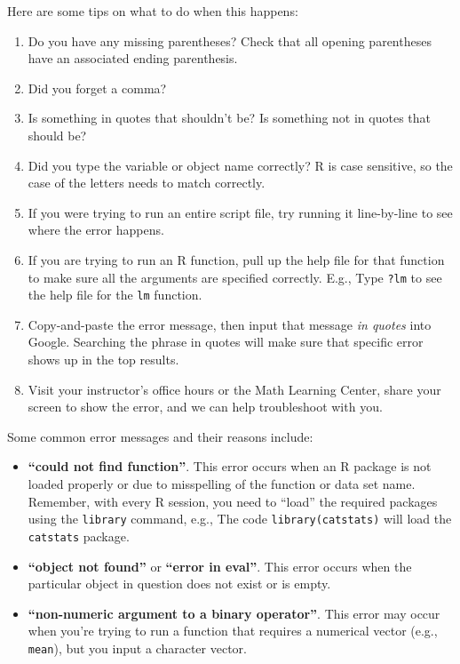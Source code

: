 \documentclass[
  10pt,
  openany]{book}
\providecommand{\tightlist}{%
  \setlength{\itemsep}{0pt}\setlength{\parskip}{0pt}}
\theoremstyle{definition}
\theoremstyle{definition}
\theoremstyle{definition}
\theoremstyle{definition}
\theoremstyle{remark}
\begin{document}
Here are some tips on what to do when this happens:

\begin{enumerate}
\def\labelenumi{\arabic{enumi}.}
\tightlist
\item
  Do you have any missing parentheses? Check that all opening parentheses have an associated ending parenthesis.
\item
  Did you forget a comma?
\item
  Is something in quotes that shouldn't be? Is something not in quotes that should be?
\item
  Did you type the variable or object name correctly? R is case sensitive, so the case of the letters needs to match correctly.
\item
  If you were trying to run an entire script file, try running it line-by-line to see where the error happens.
\item
  If you are trying to run an R function, pull up the help file for that function to make sure all the arguments are specified correctly. E.g., Type \texttt{?lm} to see the help file for the \texttt{lm} function.
\item
  Copy-and-paste the error message, then input that message \emph{in quotes} into Google. Searching the phrase in quotes will make sure that specific error shows up in the top results.
\item
  Visit your instructor's office hours or the Math Learning Center, share your screen to show the error, and we can help troubleshoot with you.
\end{enumerate}

Some common error messages and their reasons include:

\begin{itemize}
\tightlist
\item
  \textbf{``could not find function''}. This error occurs when an R package is not loaded properly or due to misspelling of the function or data set name. Remember, with every R session, you need to ``load'' the required packages using the \texttt{library} command, e.g., The code \texttt{library(catstats)} will load the \texttt{catstats} package.
\item
  \textbf{``object not found''} or \textbf{``error in eval''}. This error occurs when the particular object in question does not exist or is empty.
\item
  \textbf{``non-numeric argument to a binary operator''}. This error may occur when you're trying to run a function that requires a numerical vector (e.g., \texttt{mean}), but you input a character vector.
\end{itemize}
\end{document}
